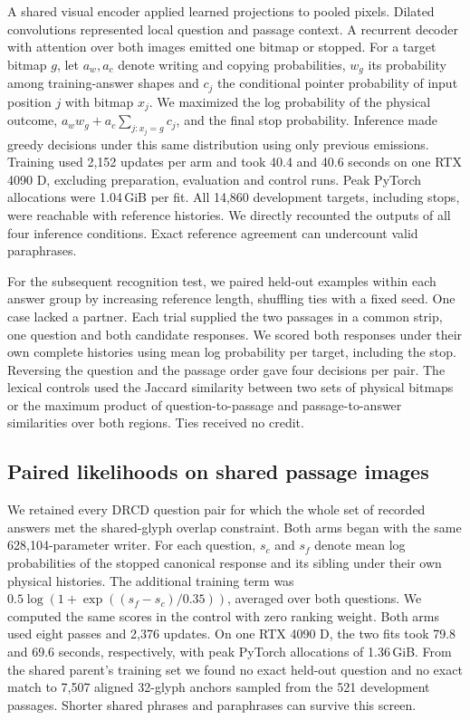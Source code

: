 \documentclass[12pt,a4paper]{article}
\providecommand{\DIFadd}[1]{{\protect\color{blue} \sf #1}} %
\begin{document}
\DIFadd{A shared visual encoder applied learned projections to pooled pixels. Dilated convolutions represented local question and passage context. A recurrent decoder with attention over both images emitted one bitmap or stopped. For a target bitmap $g$, let $a_w,a_c$ denote writing and copying probabilities, $w_g$ its probability among training-answer shapes and $c_j$ the conditional pointer probability of input position $j$ with bitmap $x_j$. We maximized the log probability of the physical outcome, $a_w w_g+a_c\sum_{j:x_j=g}c_j$, and the final stop probability. Inference made greedy decisions under this same distribution using only previous emissions. Training used 2,152 updates per arm and took 40.4 and 40.6 seconds on one RTX 4090 D, excluding preparation, evaluation and control runs. Peak PyTorch allocations were 1.04\,GiB per fit. All 14,860 development targets, including stops, were reachable with reference histories. We directly recounted the outputs of all four inference conditions. Exact reference agreement can undercount valid paraphrases.
}

\DIFadd{For the subsequent recognition test, we paired held-out examples within each answer group by increasing reference length, shuffling ties with a fixed seed. One case lacked a partner. Each trial supplied the two passages in a common strip, one question and both candidate responses. We scored both responses under their own complete histories using mean log probability per target, including the stop. Reversing the question and the passage order gave four decisions per pair. The lexical controls used the Jaccard similarity between two sets of physical bitmaps or the maximum product of question-to-passage and passage-to-answer similarities over both regions. Ties received no credit.
}

\subsection*{\DIFadd{Paired likelihoods on shared passage images}}
\DIFadd{We retained every DRCD question pair for which the whole set of recorded answers met the shared-glyph overlap constraint. Both arms began with the same 628,104-parameter writer. For each question, $s_c$ and $s_f$ denote mean log probabilities of the stopped canonical response and its sibling under their own physical histories. The additional training term was $0.5\log(1+\exp((s_f-s_c)/0.35))$, averaged over both questions. We computed the same scores in the control with zero ranking weight. Both arms used eight passes and 2,376 updates. On one RTX 4090 D, the two fits took 79.8 and 69.6 seconds, respectively, with peak PyTorch allocations of 1.36\,GiB. From the shared parent's training set we found no exact held-out question and no exact match to 7,507 aligned 32-glyph anchors sampled from the 521 development passages. Shorter shared phrases and paraphrases can survive this screen.
}
\end{document}
